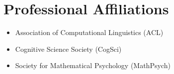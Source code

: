 \documentclass[11pt]{article}
\begin{document}
\section*{Professional Affiliations}
\begin{itemize}
    \item Association of Computational Linguistics (ACL)
    \item Cognitive Science Society (CogSci)
    \item Society for Mathematical Psychology (MathPsych)
\end{itemize}



\end{document}
